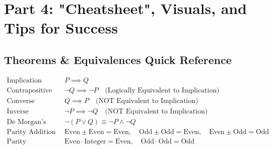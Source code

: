 \documentclass[11pt, letterpaper]{article}
\theoremstyle{definition}
\theoremstyle{remark}
\begin{document}
\newpage

\section{Part 4: "Cheatsheet", Visuals, and Tips for Success}

\subsection{Theorems \& Equivalences Quick Reference}
\begin{align*}
    \text{Implication} \quad & P \implies Q \\
    \text{Contrapositive} \quad & \neg Q \implies \neg P \quad \text{(Logically Equivalent to Implication)} \\
    \text{Converse} \quad & Q \implies P \quad \text{(NOT Equivalent to Implication)} \\
    \text{Inverse} \quad & \neg P \implies \neg Q \quad \text{(NOT Equivalent to Implication)} \\
    \text{De Morgan's} \quad & \neg(P \lor Q) \equiv \neg P \land \neg Q \\
    \text{Parity Addition} \quad & \text{Even} \pm \text{Even} = \text{Even}, \quad \text{Odd} \pm \text{Odd} = \text{Even}, \quad \text{Even} \pm \text{Odd} = \text{Odd} \\
    \text{Parity Multiplication} \quad & \text{Even} \cdot \text{Integer} = \text{Even}, \quad \text{Odd} \cdot \text{Odd} = \text{Odd}
\end{align*}
\end{document}
